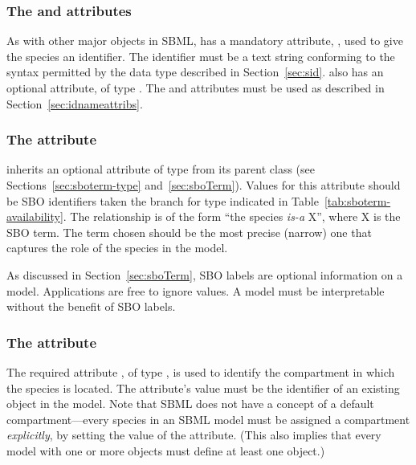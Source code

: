 \subsubsection{The  and  attributes}

As with other major objects in SBML, \Species has a mandatory
attribute, , used to give the species an identifier.  The
identifier must be a text string conforming to the syntax
permitted by the  data type described in
Section~\ref{sec:sid}.  \Species also has an optional 
attribute, of type .  The  and 
attributes must be used as described in
Section~\ref{sec:idnameattribs}.


\subsubsection{The  attribute}
\label{sec:species-sboterm}

\Species inherits an optional  attribute of type
 from its parent class \SBase (see
Sections~\ref{sec:sboterm-type} and~\ref{sec:sboTerm}).  Values
for this attribute should be SBO identifiers taken the branch for
type \Species indicated in Table~\ref{tab:sboterm-availability}.
The relationship is of the form ``the species \emph{is-a} X'',
where X is the SBO term.  The term chosen should be the most
precise (narrow) one that captures the role of the species in the
model.

As discussed in Section~\ref{sec:sboTerm}, SBO labels are optional
information on a model.  Applications are free to ignore
 values.  A model must be interpretable without the
benefit of SBO labels.


\subsubsection{The  attribute}
\label{sec:species-compartment}

The required attribute , of type
, is used to identify the compartment in which
the species is located.  The attribute's value must be the
identifier of an existing \Compartment object in the model.  Note
that SBML does not have a concept of a default compartment---every
species in an SBML model must be assigned a compartment
\emph{explicitly}, by setting the value of the 
attribute.  (This also implies that every model with one or more
\Species objects must define at least one \Compartment object.)


